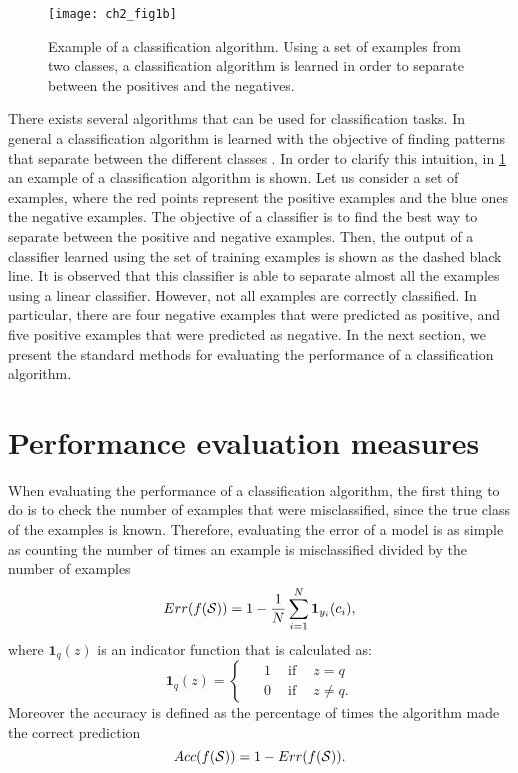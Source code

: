 \begin{figure}[!t]
\centering
\texttt{[image: ch2\_fig1b]}
\caption{Example of a classification algorithm. Using a set of examples from two classes, a 
	classification algorithm is learned in order to separate between the positives and the negatives. 
}
\label{fig:2:2}
\end{figure} 

There exists several algorithms that can be used for classification tasks. In general a 
classification algorithm is learned with the objective of finding patterns that separate between 
the different classes \citep{Hastie2009}. In order to clarify this intuition, in \figurename{ 
\ref{fig:2:2}} an example of a classification algorithm is shown. Let us consider a set of 
examples, where the red points represent the positive examples and the blue ones the negative 
examples. The objective of a classifier is to find the best way to separate between the positive and 
negative examples. Then, the output of a classifier learned using the set of training examples is 
shown as the dashed black line. It is observed that this classifier is able to separate almost all 
the examples using a linear classifier. However, not all examples are correctly classified. In 
particular, there are four negative examples that were predicted as positive, and five positive 
examples that were predicted as negative. In the next section, we present the standard methods for 
evaluating the performance of a classification algorithm.


\section{Performance evaluation measures}
\label{sec:2:measures}

When evaluating the performance of a classification algorithm, the first thing to do is to check 
the number of examples that were misclassified, since the true class of the examples 
is known. Therefore, evaluating the error of a model is as simple as counting the number of times 
an example is misclassified divided by the number of examples
\begin{equation}\label{eqn:ch2:error}
Err(f({\cal S})) = 1 -\frac{1}{N}  \sum_{i=1}^N \mathbf{1}_{y_i}(c_i),
\end{equation}
where $\mathbf{1}_q(z)$ is an indicator function that is calculated as:
\begin{equation}
   \mathbf{1}_q(z) = 
  \begin{cases}
    \phantom{-}1 \phantom{-} \mbox{if} \phantom{-} z = q\\
    \phantom{-}0 \phantom{-} \mbox{if} \phantom{-} z \neq q.
  \end{cases}
\end{equation}
Moreover the accuracy is defined as the percentage of times the algorithm 
made the correct prediction
\begin{equation}\label{eqn:2:accuracy}
Acc(f({\cal S})) = 1- Err(f({\cal S})).
\end{equation}

